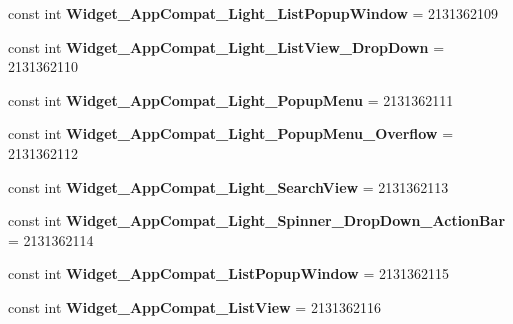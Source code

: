\begin{DoxyCompactItemize}
const int {\bfseries Widget\+\_\+\+App\+Compat\+\_\+\+Light\+\_\+\+List\+Popup\+Window} = 2131362109
\item 
\mbox{\label{class_sample_app_1_1_droid_1_1_resource_1_1_style_a45cbfb3c9c7696bfa4c0cc41d20d8058}} 
const int {\bfseries Widget\+\_\+\+App\+Compat\+\_\+\+Light\+\_\+\+List\+View\+\_\+\+Drop\+Down} = 2131362110
\item 
\mbox{\label{class_sample_app_1_1_droid_1_1_resource_1_1_style_aedd37ffd5b699ff8814f5aa27d44ad99}} 
const int {\bfseries Widget\+\_\+\+App\+Compat\+\_\+\+Light\+\_\+\+Popup\+Menu} = 2131362111
\item 
\mbox{\label{class_sample_app_1_1_droid_1_1_resource_1_1_style_a8e6f5af2451d79795a7adbe9001e32d0}} 
const int {\bfseries Widget\+\_\+\+App\+Compat\+\_\+\+Light\+\_\+\+Popup\+Menu\+\_\+\+Overflow} = 2131362112
\item 
\mbox{\label{class_sample_app_1_1_droid_1_1_resource_1_1_style_af602d1d2c80a794714c32a04957a9444}} 
const int {\bfseries Widget\+\_\+\+App\+Compat\+\_\+\+Light\+\_\+\+Search\+View} = 2131362113
\item 
\mbox{\label{class_sample_app_1_1_droid_1_1_resource_1_1_style_ab1385823acadd0679bf1a1194f5cbab2}} 
const int {\bfseries Widget\+\_\+\+App\+Compat\+\_\+\+Light\+\_\+\+Spinner\+\_\+\+Drop\+Down\+\_\+\+Action\+Bar} = 2131362114
\item 
\mbox{\label{class_sample_app_1_1_droid_1_1_resource_1_1_style_ae3a9f3145ac32797c53b31f852846489}} 
const int {\bfseries Widget\+\_\+\+App\+Compat\+\_\+\+List\+Popup\+Window} = 2131362115
\item 
\mbox{\label{class_sample_app_1_1_droid_1_1_resource_1_1_style_a2e3b8ac46e744429aedbbfb92d5814d5}} 
const int {\bfseries Widget\+\_\+\+App\+Compat\+\_\+\+List\+View} = 2131362116
\item 
\mbox{\label{class_sample_app_1_1_droid_1_1_resource_1_1_style_a6ba42d6e966c63d6082af0aa8e8236d2}} 

\end{DoxyCompactItemize}
